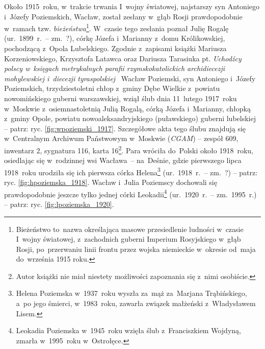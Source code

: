 Około 1915~roku, w~trakcie trwania I~wojny światowej, najstarszy syn
Antoniego
i~Józefy Poziemskich,
Wacław, został zesłany
w~głąb Rosji prawdopodobnie w~ramach tzw.
\emph{bieżeństwa}\footnote{Bieżeństwo to~nazwa określająca masowe
przesiedlenie ludności w~czasie I~wojny światowej, z~zachodnich guberni
Imperium Rosyjskiego w~głąb Rosji, po~przerwaniu linii frontu przez wojska
niemieckie w~okresie od~maja do~września 1915 roku.}. W~czasie tego zesłania
poznał Julię Rogalę
(ur.~1899~r.~-- zm.~?), córkę Józefa i~Marianny z~domu Królikowskiej,
pochodzącą z~Opola Lubelskiego. Zgodnie z~zapisami książki Mariusza
Korzeniowskiego, Krzysztofa Latawca oraz Dariusza Tarasiuka pt.
\emph{Uchodźcy polscy w~księgach metrykalnych parafii rzymskokatolickich
archidiecezji mohylewskiej i~diecezji tyraspolskiej}~\cite{korzeniowski}
Wacław Poziemski, syn Antoniego
i~Józefy Poziemskich, trzydziestoletni chłop z~gminy Dębe Wielkie z~powiatu
nowomińskiego guberni warszawskiej, wziął ślub dnia 11~lutego 1917~roku
w~Moskwie z~osiemnastoletnią Julią
Rogalą, córką Józefa i~Marianny, chłopką z~gminy Opole, powiatu
nowoaleksandryjskiego (puławskiego) guberni lubelskiej -- patrz: ryc.
\ref{fig:wpoziemski_1917}. Szczegółowe akta tego ślubu znajdują
się w~Centralnym Archiwum Państwowym w~Moskwie (\emph{CGAM}) -- zespół 609,
inwentarz 2, sygnatura 116, karta 16\footnote{Autor książki nie miał
niestety możliwości zapoznania się z~nimi osobiście.}. Para wróciła do~Polski
około 1918~roku, osiedlając się w~rodzinnej wsi Wacława~-- na~Deśnie,
gdzie pierwszego lipca 1918~roku urodziła się ich pierwsza córka
Helena\footnote{Helena
Poziemska w~1937~roku wyszła za~mąż za~Marjana Trąbińskiego, a~po jego
śmierci, w~1983~roku, zawarła związek małżeński z~Władysławem Lisem.}
(ur.~1918~r.~-- zm.~?) -- patrz: ryc. \ref{fig:hpoziemska_1918}.
Wacław
i~Julia Poziemscy
dochowali się prawdopodobnie jeszcze tylko jednej córki
Leokadii\footnote{Leokadia
Poziemska w~1945~roku wzięła ślub z~Franciszkiem Wojdyną, zmarła w~1995~roku
w~Ostrołęce.} (ur.~1920~r.~-- zm.~1995~r.) -- patrz: ryc.
\ref{fig:lpoziemska_1920}.

